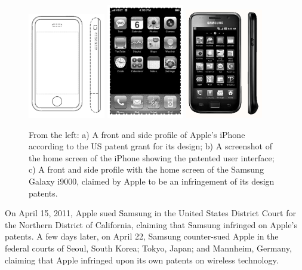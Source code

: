 \documentclass[prodmode,cs196]{acmlarge}
\begin{document}
\begin{figure}[H]
	\includegraphics[width=0.3\textwidth]{apple_iphone_shape.png}
	\includegraphics[width=0.3\textwidth]{apple_iphone_icons.png}
	\includegraphics[width=0.3\textwidth]{samsung-galaxy-i9000.png}
	\caption{From the left: a) A front and side profile of Apple's iPhone according to the US patent grant for its design; b) A screenshot of the home screen of the iPhone showing the patented user interface; c) A front and side profile with the home screen of the Samsung Galaxy i9000, claimed by Apple to be an infringement of its design patents. }
\end{figure}

On April 15, 2011, Apple sued Samsung in the United States District Court for the Northern District of California, claiming that Samsung infringed on Apple's patents. A few days later, on April 22, Samsung counter-sued Apple in the federal courts of Seoul, South Korea; Tokyo, Japan; and Mannheim, Germany, claiming that Apple infringed upon its own patents on wireless technology.
\end{document}
